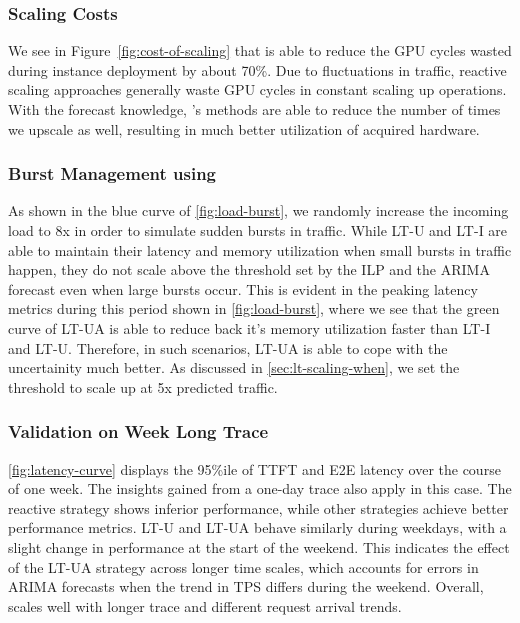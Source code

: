 \subsubsection{Scaling Costs}
We see in Figure~\ref{fig:cost-of-scaling} that \sys is able to reduce the GPU cycles wasted during instance deployment by about 70\%. Due to fluctuations in traffic, reactive scaling approaches generally waste GPU cycles in constant scaling up operations. With the forecast knowledge, \sys's methods are able to reduce the number of times we upscale as well, resulting in much better utilization of acquired hardware. 
\subsubsection{Burst Management using \sys}\label{sec:loadbursts}
As shown in the blue curve of \autoref{fig:load-burst}, we randomly increase the incoming load to 8x in order to simulate sudden bursts in traffic.  While LT-U and LT-I are able to maintain their latency and memory utilization when small bursts in traffic happen, they do not scale above the threshold set by the ILP and the ARIMA forecast even when large bursts occur. This is evident in the peaking latency metrics during this period shown in \autoref{fig:load-burst}, where we see that the green curve of LT-UA is able to reduce back it's memory utilization faster than LT-I and LT-U. Therefore, in such scenarios, LT-UA is able to cope with the uncertainity much better. As discussed in \autoref{sec:lt-scaling-when}, we set the threshold to scale up at 5x predicted traffic.



\subsubsection{Validation on Week Long Trace} \label{sec:salability}
\autoref{fig:latency-curve} displays the 95\%ile of TTFT and E2E latency over the course of one week. The insights gained from a one-day trace also apply in this case. The reactive strategy shows inferior performance, while other strategies achieve better performance metrics. LT-U and LT-UA behave similarly during weekdays, with a slight change in performance at the start of the weekend. This indicates the effect of the LT-UA strategy across longer time scales, which accounts for errors in ARIMA forecasts when the trend in TPS differs during the weekend. Overall, \sys scales well with longer trace and different request arrival trends.

